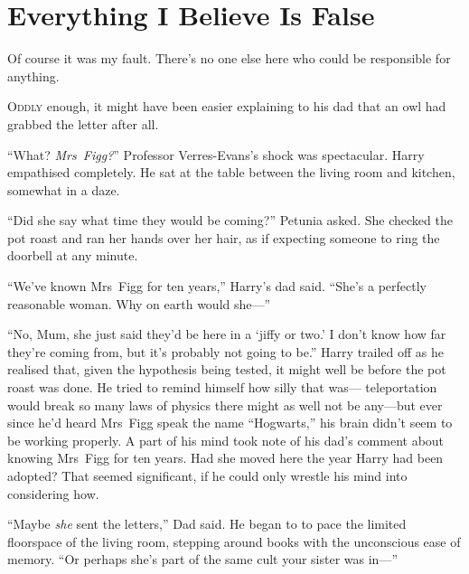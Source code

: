 
\chapter{Everything I Believe Is False}

\begin{chapterOpeningQuote}
Of course it was my fault. There’s no one else here who could be responsible for anything.
\end{chapterOpeningQuote}

\lettrine{O}{ddly} enough, it might have been easier explaining to his
dad that an owl had grabbed the letter after all.

“What? \emph{Mrs~Figg?}” Professor Verres-Evans’s shock was
spectacular. Harry empathised completely. He sat at the
table between the living room and kitchen, somewhat in a daze.

“Did she say what time they would be coming?” Petunia
asked. She checked the pot roast and ran her hands over
her hair, as if expecting someone to ring the doorbell at any minute.

“We’ve known Mrs~Figg for ten years,” Harry’s dad said.
“She’s a perfectly reasonable woman. Why on earth would
she—”

“No, Mum, she just said they’d be here in a ‘jiffy or two.’
I don’t know how far they’re coming from, but it’s probably not
going to be.” Harry trailed off as he realised that, given
the hypothesis being tested, it might well be before the pot
roast was done. He tried to remind himself how silly that was—
teleportation would break so many laws of physics there
might as well not be any—but ever since he’d heard Mrs~Figg
speak the name “Hogwarts,” his brain
didn’t seem to be working properly. A part of his mind
took note of his dad’s comment about knowing Mrs~Figg
for ten years. Had she moved here the year Harry had
been adopted? That seemed significant, if he could only
wrestle his mind into considering how.

“Maybe \emph{she} sent the letters,” Dad said. He began to to
pace the limited floorspace of the living room, stepping
around books with the unconscious ease of memory. “Or perhaps
she’s part of the same cult your sister was in—”

